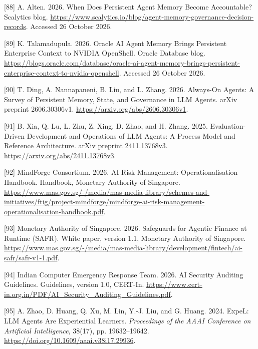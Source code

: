 \documentclass[
  11pt,
]{article}
\newlength{\cslhangindent}
\newlength{\cslentryspacingunit} %
\newenvironment{CSLReferences}[2] %
 {%
  \setlength{\parindent}{0pt}
  \ifodd #1
  \let\oldpar\par
  \def\par{\hangindent=\cslhangindent\oldpar}
  \fi
  \setlength{\parskip}{#2\cslentryspacingunit}
 }%
 {}
\begin{document}
\begin{CSLReferences}{1}{1}
\leavevmode{}%
{[}88{]} A. Alten. 2026. When Does Persistent Agent Memory Become
Accountable? Scalytics blog.
\url{https://www.scalytics.io/blog/agent-memory-governance-decision-records}.
Accessed 26 October 2026.

\leavevmode{}%
{[}89{]} K. Talamadupula. 2026. Oracle AI Agent Memory Brings Persistent
Enterprise Context to NVIDIA OpenShell. Oracle Database blog.
\url{https://blogs.oracle.com/database/oracle-ai-agent-memory-brings-persistent-enterprise-context-to-nvidia-openshell}.
Accessed 26 October 2026.

\leavevmode{}%
{[}90{]} T. Ding, A. Nannapaneni, B. Liu, and L. Zhang. 2026. Always-On
Agents: A Survey of Persistent Memory, State, and Governance in LLM
Agents. arXiv preprint 2606.30306v1.
\url{https://arxiv.org/abs/2606.30306v1}.

\leavevmode{}%
{[}91{]} B. Xia, Q. Lu, L. Zhu, Z. Xing, D. Zhao, and H. Zhang. 2025.
Evaluation-Driven Development and Operations of LLM Agents: A Process
Model and Reference Architecture. arXiv preprint 2411.13768v3.
\url{https://arxiv.org/abs/2411.13768v3}.

\leavevmode{}%
{[}92{]} MindForge Consortium. 2026. AI Risk Management:
Operationalisation Handbook. Handbook, Monetary Authority of Singapore.
\url{https://www.mas.gov.sg/-/media/mas-media-library/schemes-and-initiatives/ftig/project-mindforge/mindforge-ai-risk-management-operationalisation-handbook.pdf}.

\leavevmode{}%
{[}93{]} Monetary Authority of Singapore. 2026. Safeguards for Agentic
Finance at Runtime (SAFR). White paper, version 1.1, Monetary Authority
of Singapore.
\url{https://www.mas.gov.sg/-/media/mas-media-library/development/fintech/ai-safr/safr-v1-1.pdf}.

\leavevmode{}%
{[}94{]} Indian Computer Emergency Response Team. 2026. AI Security
Auditing Guidelines. Guidelines, version 1.0, CERT-In.
\url{https://www.cert-in.org.in/PDF/AI_Security_Auditing_Guidelines.pdf}.

\leavevmode{}%
{[}95{]} A. Zhao, D. Huang, Q. Xu, M. Lin, Y.-J. Liu, and G. Huang.
2024. ExpeL: LLM Agents Are Experiential Learners. \emph{Proceedings of
the AAAI Conference on Artificial Intelligence}, 38(17), pp.
19632--19642. \url{https://doi.org/10.1609/aaai.v38i17.29936}.


\end{CSLReferences}
\end{document}
